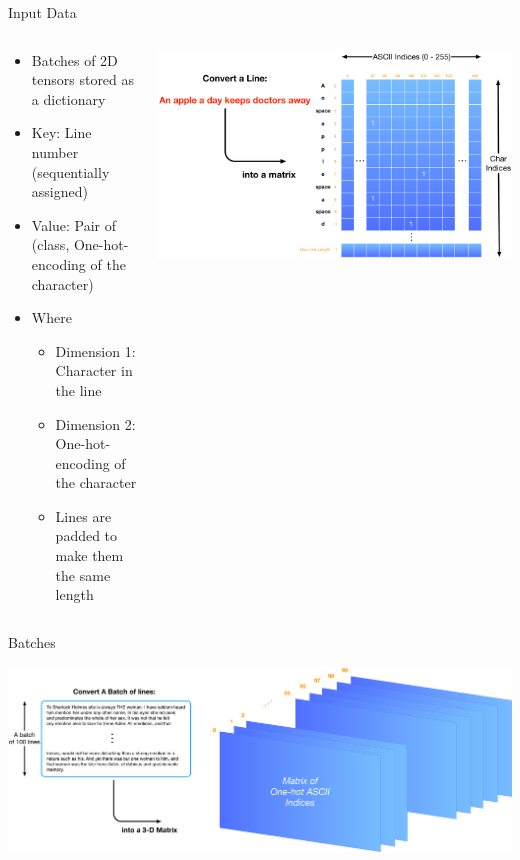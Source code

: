 \documentclass[aspectratio=169]{beamer}
\begin{document}
\begin{frame}[fragile]{Input Data}

\begin{columns}
\begin{column}{0.5\textwidth}
\begin{itemize}
\item Batches of 2D tensors stored as a dictionary
\item Key: Line number (sequentially assigned)
\item Value: Pair of (class, One-hot-encoding of the character)
\item Where 
\begin{itemize}
\item Dimension 1: Character in the line
\item Dimension 2: One-hot-encoding of the character 
\item Lines are padded to make them the same length
\end{itemize}
\end{itemize}
\end{column}
\begin{column}{0.5\textwidth}
\includegraphics[width=1\textwidth]{lectTF/onehotencoding.pdf}
\end{column}
\end{columns}
\end{frame}
\begin{frame}[fragile]{Batches}

\includegraphics[width=1\textwidth]{lectTF/batch.pdf}


\end{frame}
\end{document}
